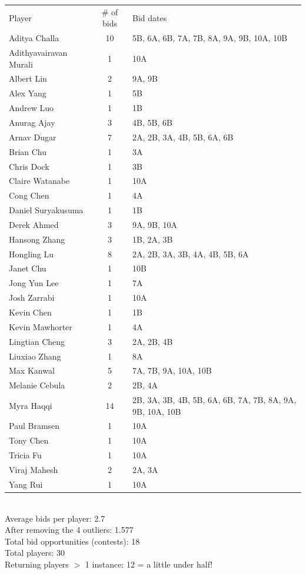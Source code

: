 \documentclass[leqno]{article}
\begin{document}
\begin{tabular}{l c l}
Player & \# of bids & Bid dates\\
Aditya Challa & 10 & 5B, 6A, 6B, 7A, 7B, 8A, 9A, 9B, 10A, 10B\\
Adithyavairavan Murali & 1 & 10A\\
Albert Lin & 2 & 9A, 9B\\
Alex Yang & 1 & 5B\\
Andrew Luo & 1 & 1B\\
Anurag Ajay & 3 & 4B, 5B, 6B\\
Arnav Dugar & 7 & 2A, 2B, 3A, 4B, 5B, 6A, 6B\\
Brian Chu & 1 & 3A\\
Chris Dock & 1 & 3B\\
Claire Watanabe & 1 & 10A\\
Cong Chen & 1 & 4A\\
Daniel Suryakusuma & 1 & 1B\\
Derek Ahmed & 3 & 9A, 9B, 10A\\
Hansong Zhang & 3 & 1B, 2A, 3B\\
Hongling Lu & 8 & 2A, 2B, 3A, 3B, 4A, 4B, 5B, 6A\\
Janet Chu & 1 & 10B\\
Jong Yun Lee & 1 & 7A\\
Josh Zarrabi & 1 & 10A\\
Kevin Chen & 1 & 1B\\
Kevin Mawhorter & 1 & 4A\\
Lingtian Cheng & 3 & 2A, 2B, 4B\\
Liuxiao Zhang & 1 & 8A\\
Max Kanwal & 5 & 7A, 7B, 9A, 10A, 10B\\
Melanie Cebula & 2 & 2B, 4A\\
Myra Haqqi & 14 & 2B, 3A, 3B, 4B, 5B, 6A, 6B, 7A, 7B, 8A, 9A, 9B, 10A, 10B\\
Paul Bramsen & 1 & 10A\\
Tony Chen & 1 & 10A\\
Tricia Fu & 1 & 10A\\
Viraj Mahesh & 2 & 2A, 3A\\
Yang Rui & 1 & 10A
\end{tabular}\\

Average bids per player: 2.7\\
After removing the 4 outliers: 1.577\\
Total bid opportunities (contests): 18\\
Total players: 30\\
Returning players $>$ 1 instance: 12 = a little under half!\\
\end{document}
